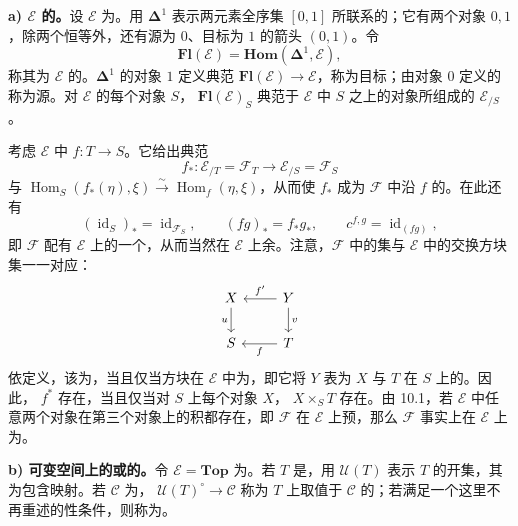 \textbf{a) $\mathcal E$ 的。}设 $\mathcal E$ 为。用 $\boldsymbol\Delta^1$ 表示两元素全序集 $[0,1]$ 所联系的；它有两个对象 $0,1$，除两个恒等外，还有源为 $0$、目标为 $1$ 的箭头 $(0,1)$。令
\[
 \mathbf{Fl}(\mathcal E)=\mathbf{Hom}(\boldsymbol\Delta^1,\mathcal E),
\]
称其为 $\mathcal E$ 的。$\boldsymbol\Delta^1$ 的对象 $1$ 定义典范 $\mathbf{Fl}(\mathcal E)\to\mathcal E$，称为目标；由对象 $0$ 定义的称为源。对 $\mathcal E$ 的每个对象 $S$， $\mathbf{Fl}(\mathcal E)_S$ 典范于 $\mathcal E$ 中 $S$ 之上的对象所组成的 $\mathcal E_{/S}$。

考虑 $\mathcal E$ 中 $f:T\to S$。它给出典范
\[
 f_*:\mathcal E_{/T}=\mathcal F_T\longrightarrow\mathcal E_{/S}=\mathcal F_S
\]
与 $\operatorname{Hom}_S(f_*(\eta),\xi)\xrightarrow{\sim}\operatorname{Hom}_f(\eta,\xi)$，从而使 $f_*$ 成为 $\mathcal F$ 中沿 $f$ 的。在此还有
\[
 (\operatorname{id}_S)_*=\operatorname{id}_{\mathcal F_S},\qquad
 (fg)_*=f_*g_*,\qquad c^{f,g}=\operatorname{id}_{(fg)},
\]
即 $\mathcal F$ 配有 $\mathcal E$ 上的一个，从而当然在 $\mathcal E$ 上余。注意，$\mathcal F$ 中的集与 $\mathcal E$ 中的交换方块集一一对应：
\[
\begin{tikzcd}
 X\arrow[d,"u"']&Y\arrow[l,"f'"']\arrow[d,"v"]\\
 S&T\arrow[l,"f"]
\end{tikzcd}
\]
依定义，该为，当且仅当方块在 $\mathcal E$ 中为，即它将 $Y$ 表为 $X$ 与 $T$ 在 $S$ 上的。因此， $f^*$ 存在，当且仅当对 $S$ 上每个对象 $X$， $X\times_ST$ 存在。由 10.1，若 $\mathcal E$ 中任意两个对象在第三个对象上的积都存在，即 $\mathcal F$ 在 $\mathcal E$ 上预，那么 $\mathcal F$ 事实上在 $\mathcal E$ 上为。

\textbf{b) 可变空间上的或的。}令 $\mathcal E=\mathbf{Top}$ 为。若 $T$ 是，用 $\mathcal U(T)$ 表示 $T$ 的开集，其为包含映射。若 $\mathcal C$ 为， $\mathcal U(T)^\circ\to\mathcal C$ 称为 $T$ 上取值于 $\mathcal C$ 的；若满足一个这里不再重述的性条件，则称为。

